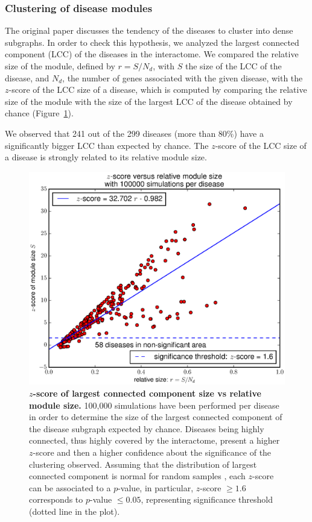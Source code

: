 \documentclass[letterpaper]{article}
\begin{document}
		\subsubsection{Clustering of disease modules}
		The original paper discusses the tendency of the diseases to cluster into dense subgraphs. In order
		to check this hypothesis, we analyzed the largest connected component (LCC) of the diseases in the
		interactome. We compared the relative size of the module, defined by $r = S/N_d$, with $S$ the size
		of the LCC of the disease, and $N_d$, the number of genes associated with the given disease, with
		the $z$-score of the LCC size of a disease, which is computed by comparing the relative size of the
		module with the size of the largest LCC of the disease obtained by chance (Figure~\ref{fig:zscore}).

		We observed that 241 out of the 299 diseases (more than $80\%$) have a significantly bigger LCC than
		expected by chance. The $z$-score of the LCC size of a disease is strongly related to its relative
		module size.

		\begin{figure}[!h]
			\includegraphics[width=.5\textwidth]{images/S4.b100000.eps}
			\caption{\textbf {$z$-score of largest connected component size vs relative module size.}
			100,000 simulations have been performed per disease in order to determine the size of the largest
			connected component of the disease subgraph expected by chance. Diseases being highly connected,
			thus highly covered by the interactome, present a higher $z$-score and then a higher confidence
			about the significance of the clustering observed. Assuming that the distribution of largest
			connected component is normal for random samples \citep{fluctuationGiantComponent}, each $z$-score
			can be associated to a $p$-value, in particular, $z$-score $\geq 1.6$ corresponds to $p$-value
			$\leq 0.05$, representing significance threshold (dotted line in the plot).
			\label{fig:zscore}}
		\end{figure}
\end{document}
